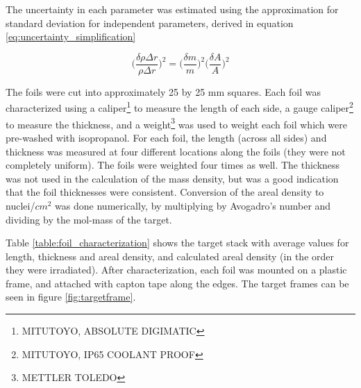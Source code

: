 \documentclass[a4paper,11pt,twoside]{book}
\begin{document}
\noindent
The uncertainty in each parameter was estimated using the approximation for standard deviation for independent parameters, derived in equation \ref{eq:uncertainty_simplification}

\begin{equation}
    \Big(\frac{\delta \rho \Delta r}{\rho \Delta r}\Big)^2= \Big(\frac{\delta m}{m}\Big)^2 \Big(\frac{\delta A}{A}\Big)^2
\end{equation}

\noindent 
The foils were cut into approximately 25 by 25 mm squares. Each foil was characterized using a caliper\footnote{MITUTOYO, ABSOLUTE DIGIMATIC} to measure the length of each side, a gauge caliper\footnote{MITUTOYO, IP65 COOLANT PROOF} to measure the thickness, and a weight\footnote{METTLER TOLEDO} was used to weight each foil which were pre-washed with isopropanol. For each foil, the length (across all sides) and thickness was measured at four different locations along the foils (they were not completely uniform). The foils were weighted four times as well. The thickness was not used in the calculation of the mass density, but was a good indication that the foil thicknesses were consistent. Conversion of the areal density to nuclei/$cm^2$ was done numerically, by multiplying by Avogadro's number and dividing by the mol-mass of the target.

\noindent
Table \ref{table:foil_characterization} shows the target stack with average values for length, thickness and areal density, and calculated areal density (in the order they were irradiated). After characterization, each foil was mounted on a plastic frame, and attached with capton tape along the edges. The target frames can be seen in figure \ref{fig:targetframe}. 
\end{document}
